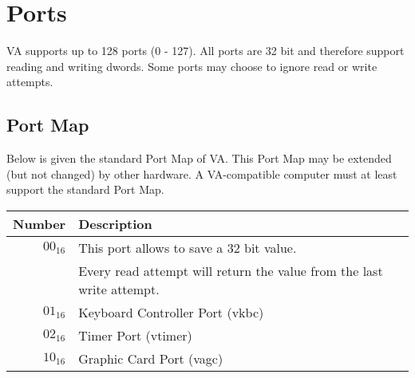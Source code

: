 \section{Ports}

VA supports up to 128 ports (0 - 127). All ports are 32 bit and therefore support reading and writing dwords. Some ports may choose to ignore
read or write attempts. 

\subsection{Port Map}

Below is given the standard Port Map of VA. This Port Map may be extended (but not changed) by other hardware. A VA-compatible computer
must at least support the standard Port Map. 

\begin{tabular}{ | r | l | }
	\hline
	\textbf{Number} & \textbf{Description} \\
	\hline
	$00_{16}$ & This port allows to save a 32 bit value. \\
                  & Every read attempt will return the value from the last write attempt. \\
	\hline
	$01_{16}$ & Keyboard Controller Port (vkbc) \\
	\hline
	$02_{16}$ & Timer Port (vtimer) \\
	\hline
	$10_{16}$ & Graphic Card Port (vagc) \\
	\hline
\end{tabular}
